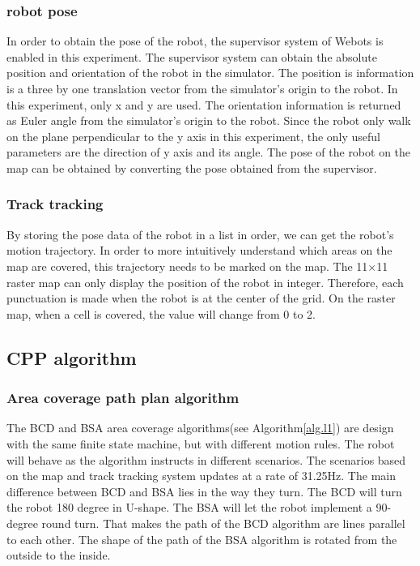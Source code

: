 \documentclass[conference]{IEEEtran}
\begin{document}
\subsubsection{robot pose}

In order to obtain the pose of the robot, the supervisor system of Webots is enabled in this experiment. The supervisor system can obtain the absolute position and orientation of the robot in the simulator. The position is information is a three by one translation vector from the simulator's origin to the robot. In this experiment, only x and y are used. The orientation information is returned as Euler angle from the simulator's origin to the robot. Since the robot only walk on the plane perpendicular to the y axis in this experiment, the only useful parameters are the direction of y axis and its angle. The pose of the robot on the map can be obtained by converting the pose obtained from the supervisor. 

\subsubsection{Track tracking}

By storing the pose data of the robot in a list in order, we can get the robot's motion trajectory. In order to more intuitively understand which areas on the map are covered, this trajectory needs to be marked on the map. The 11×11 raster map can only display the position of the robot in integer. Therefore, each punctuation is made when the robot is at the center of the grid. On the raster map, when a cell is covered, the value will change from 0 to 2.

\subsection{CPP algorithm}

\subsubsection{Area coverage path plan algorithm}

The BCD and BSA area coverage algorithms(see Algorithm\ref{alg.l1}) are design with the same finite state machine, but with different motion rules. The robot will behave as the algorithm instructs in different scenarios. The scenarios based on the map and track tracking system updates at a rate of 31.25Hz. The main difference between BCD and BSA lies in the way they turn. The BCD will turn the robot 180 degree in U-shape. The BSA will let the robot implement a 90-degree round turn. That makes the path of the BCD algorithm are lines parallel to each other. The shape of the path of the BSA algorithm is rotated from the outside to the inside. 
\end{document}
